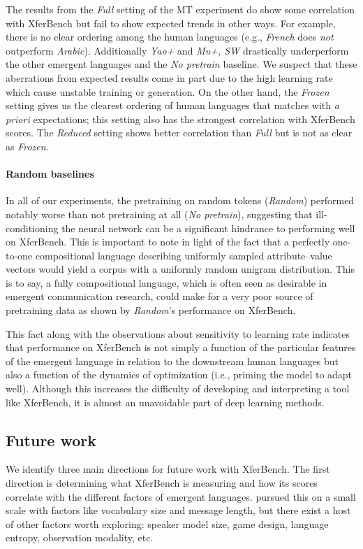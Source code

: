 The results from the \emph{Full} setting of the MT experiment do show some correlation with XferBench but fail to show expected trends in other ways.
For example, there is no clear ordering among the human languages (e.g., \emph{French} does \emph{not} outperform \emph{Arabic}).
Additionally \emph{Yao+} and \emph{Mu+, SW} drastically underperform the other emergent languages and the \emph{No pretrain} baseline.
We suspect that these aberrations from expected results come in part due to the high learning rate which cause unstable training or generation.
On the other hand, the \emph{Frozen} setting gives us the clearest ordering of human languages that matches with \emph{a priori} expectations; this setting also has the strongest correlation with XferBench scores.
The \emph{Reduced} setting shows better correlation than \emph{Full} but is not as clear as \emph{Frozen}.


\paragraph{Random baselines}
In all of our experiments, the pretraining on random tokens (\emph{Random}) performed notably worse than not pretraining at all (\emph{No pretrain}), suggesting that ill-conditioning the neural network can be a significant hindrance to performing well on XferBench.
This is important to note in light of the fact that a perfectly one-to-one compositional language describing uniformly sampled attribute--value vectors would yield a corpus with a uniformly random unigram distribution.
This is to say, a fully compositional language, which is often seen as desirable in emergent communication research, could make for a very poor source of pretraining data as shown by \emph{Random}'s performance on XferBench.

This fact along with the observations about sensitivity to learning rate indicates that performance on XferBench is not simply a function of the particular features of the emergent language in relation to the downstream human languages but also a function of the dynamics of optimization (i.e., priming the model to adapt well).
Although this increases the difficulty of developing and interpreting a tool like XferBench, it is almost an unavoidable part of deep learning methods.

\subsection{Future work}
We identify three main directions for future work with XferBench.
The first direction is determining what XferBench is measuring and how its scores correlate with the different factors of emergent languages.
\citet[app.\@ B.4]{yao2022linking} pursued this on a small scale with factors like vocabulary size and message length, but there exist a host of other factors worth exploring: speaker model size, game design, language entropy, observation modality, etc.

